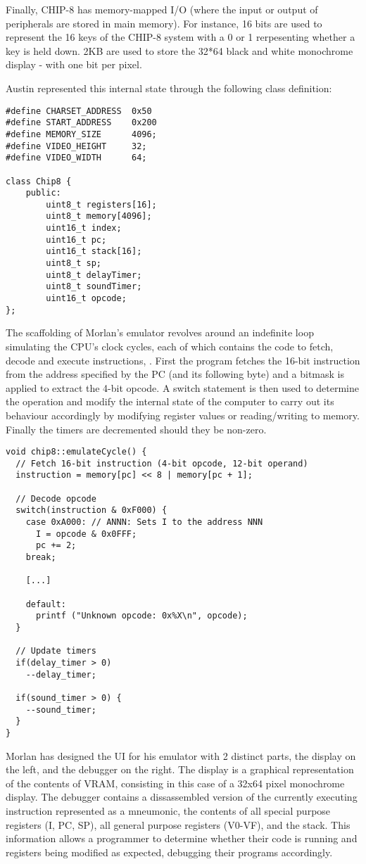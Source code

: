 Finally, CHIP-8 has memory-mapped I/O (where the input or output of peripherals are stored in main memory). For instance, 16 bits are used to represent the 16 keys of the CHIP-8 system with a 0 or 1 rerpesenting whether a key is held down. 2KB are used to store the 32*64 black and white monochrome display - with one bit per pixel.

Austin represented this internal state through the following class definition:
\begin{lstlisting}
#define CHARSET_ADDRESS  0x50
#define START_ADDRESS    0x200
#define MEMORY_SIZE      4096;
#define VIDEO_HEIGHT     32;
#define VIDEO_WIDTH      64;

class Chip8 {
    public:
        uint8_t registers[16];
        uint8_t memory[4096];
        uint16_t index;
        uint16_t pc;
        uint16_t stack[16];
        uint8_t sp;
        uint8_t delayTimer;
        uint8_t soundTimer;
        uint16_t opcode;
};
\end{lstlisting}

The scaffolding of Morlan's emulator revolves around an indefinite loop simulating the CPU's clock cycles, each of which contains the code to fetch, decode and execute instructions, \textcite{Muller-CHIP-8}. First the program fetches the 16-bit instruction from the address specified by the PC (and its following byte) and a bitmask is applied to extract the 4-bit opcode. A switch statement is then used to determine the operation and modify the internal state of the computer to carry out its behaviour accordingly by modifying register values or reading/writing to memory. Finally the timers are decremented should they be non-zero. 

\begin{lstlisting}
void chip8::emulateCycle() {
  // Fetch 16-bit instruction (4-bit opcode, 12-bit operand)
  instruction = memory[pc] << 8 | memory[pc + 1];
 
  // Decode opcode
  switch(instruction & 0xF000) {    
    case 0xA000: // ANNN: Sets I to the address NNN
      I = opcode & 0x0FFF;
      pc += 2;
    break;

    [...]
 
    default:
      printf ("Unknown opcode: 0x%X\n", opcode);
  }  
 
  // Update timers
  if(delay_timer > 0)
    --delay_timer;
 
  if(sound_timer > 0) {
    --sound_timer;
  }  
}
\end{lstlisting}

Morlan has designed the UI for his emulator with 2 distinct parts, the display on the left, and the debugger on the right. The display is a graphical representation of the contents of VRAM, consisting in this case of a 32x64 pixel monochrome display. The debugger contains a dissassembled version of the currently executing instruction represented as a mneumonic, the contents of all special purpose registers (I, PC, SP), all general purpose registers (V0-VF), and the stack. This information allows a programmer to determine whether their code is running and registers being modified as expected, debugging their programs accordingly.


